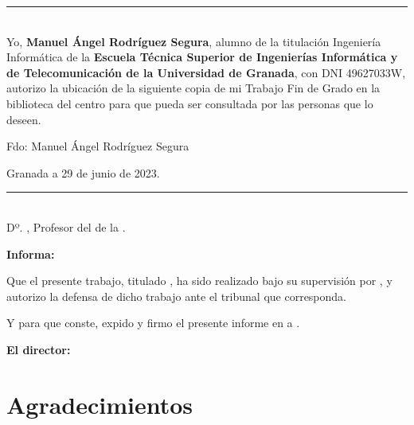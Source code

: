 \cleardoublepage
\thispagestyle{empty}

\noindent\rule[-1ex]{\textwidth}{2pt}\\[4.5ex]

Yo, \textbf{Manuel Ángel Rodríguez Segura}, alumno de la titulación Ingeniería Informática de la \textbf{Escuela Técnica Superior
de Ingenierías Informática y de Telecomunicación de la Universidad de Granada}, con DNI 49627033W, autorizo la
ubicación de la siguiente copia de mi Trabajo Fin de Grado en la biblioteca del centro para que pueda ser
consultada por las personas que lo deseen.

\vspace{6cm}

\noindent Fdo: Manuel Ángel Rodríguez Segura

\vspace{2cm}

\begin{flushright}
Granada a 29 de junio de 2023.
\end{flushright}


\cleardoublepage
\thispagestyle{empty}

\noindent\rule[-1ex]{\textwidth}{2pt}\\[4.5ex]

Dº. \textbf{\myProf}, Profesor del \myDepartment de la \myUni.

\vspace{0.5cm}

\textbf{Informa:}

\vspace{0.5cm}

Que el presente trabajo, titulado \textit{\textbf{\myTitle}},
ha sido realizado bajo su supervisión por \textbf{\myName}, y autorizo la defensa de dicho trabajo ante el tribunal
que corresponda.

\vspace{0.5cm}

Y para que conste, expido y firmo el presente informe en \myLocation a \myTime.

\vspace{1cm}

\textbf{El director:}

\vspace{5cm}

\noindent \textbf{\myProf}

\chapter*{Agradecimientos}
\thispagestyle{empty}

